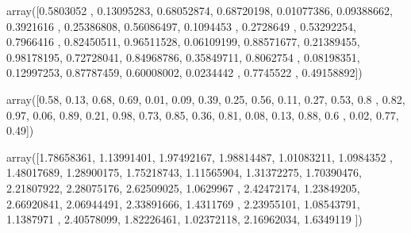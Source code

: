 \documentclass[letterpaper,10pt,english]{jupyterBook}
\begin{document}
\begin{sphinxVerbatim}[commandchars=\\\{\}]
array([0.5803052 , 0.13095283, 0.68052874, 0.68720198, 0.01077386,
       0.09388662, 0.3921616 , 0.25386808, 0.56086497, 0.1094453 ,
       0.2728649 , 0.53292254, 0.7966416 , 0.82450511, 0.96511528,
       0.06109199, 0.88571677, 0.21389455, 0.98178195, 0.72728041,
       0.84968786, 0.35849711, 0.8062754 , 0.08198351, 0.12997253,
       0.87787459, 0.60008002, 0.0234442 , 0.7745522 , 0.49158892])
\end{sphinxVerbatim}

\begin{sphinxVerbatim}[commandchars=\\\{\}]
    
\end{sphinxVerbatim}

\begin{sphinxVerbatim}[commandchars=\\\{\}]
array([0.58, 0.13, 0.68, 0.69, 0.01, 0.09, 0.39, 0.25, 0.56, 0.11, 0.27,
       0.53, 0.8 , 0.82, 0.97, 0.06, 0.89, 0.21, 0.98, 0.73, 0.85, 0.36,
       0.81, 0.08, 0.13, 0.88, 0.6 , 0.02, 0.77, 0.49])
\end{sphinxVerbatim}

\begin{sphinxVerbatim}[commandchars=\\\{\}]
   
\end{sphinxVerbatim}

\begin{sphinxVerbatim}[commandchars=\\\{\}]
array([1.78658361, 1.13991401, 1.97492167, 1.98814487, 1.01083211,
       1.0984352 , 1.48017689, 1.28900175, 1.75218743, 1.11565904,
       1.31372275, 1.70390476, 2.21807922, 2.28075176, 2.62509025,
       1.0629967 , 2.42472174, 1.23849205, 2.66920841, 2.06944491,
       2.33891666, 1.4311769 , 2.23955101, 1.08543791, 1.1387971 ,
       2.40578099, 1.82226461, 1.02372118, 2.16962034, 1.6349119 ])
\end{sphinxVerbatim}

\begin{sphinxVerbatim}[commandchars=\\\{\}]
   
\end{sphinxVerbatim}
\end{document}
